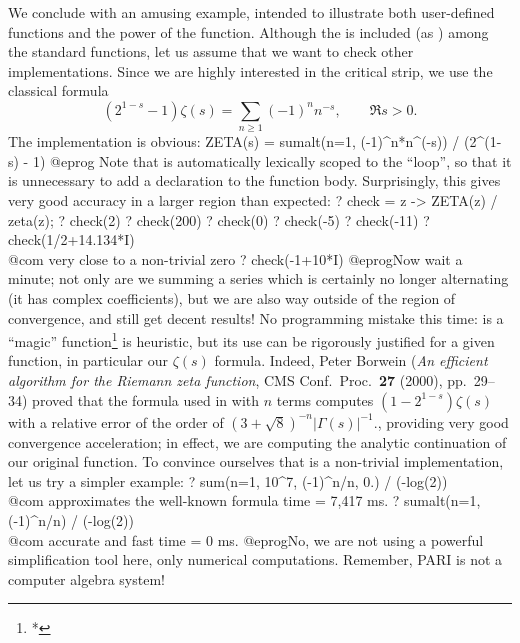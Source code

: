  We conclude with an amusing example, intended to
illustrate both user-defined functions and the power of the 
function. Although the  is included (as
) among the standard functions, let us assume that we want to check
other implementations. Since we are highly interested in the critical strip,
we use the classical formula
$$ (2^{1-s} - 1)\zeta(s) = \sum_{n\geq 1} (-1)^n n^{-s},
  \qquad\Re s > 0.$$
The implementation is obvious:
\bprog
ZETA(s) = sumalt(n=1, (-1)^n*n^(-s)) / (2^(1-s) - 1)
@eprog
\noindent
Note that  is automatically lexically scoped to the 
``loop'', so that it is unnecessary to add a  declaration to the
function body. Surprisingly, this gives very good accuracy in a larger region
than expected:
\bprog
? check = z -> ZETA(z) / zeta(z);
? check(2)
? check(200)
? check(0)
? check(-5)
? check(-11)
? check(1/2+14.134*I)  \\@com very close to a non-trivial zero
? check(-1+10*I)
@eprog\noindent Now wait a minute; not only are we summing a series which is
certainly no longer alternating (it has complex coefficients), but we are
also way outside of the region of convergence, and still get decent results! No
programming mistake this time:  is a
``magic'' function\footnote{*}{ is heuristic, but its use can be
rigorously justified for a given function, in particular our $\zeta(s)$
formula. Indeed, Peter Borwein (\emph{An efficient algorithm for the Riemann
zeta function}, CMS Conf.~Proc.~{\bf 27} (2000), pp.~29--34) proved that the
formula used in  with $n$ terms computes $(1-2^{1-s})\zeta(s)$
with a relative error of the order of $(3+\sqrt{8})^{-n}|\Gamma(s)|^{-1}$.},
providing very good convergence acceleration; in effect, we are computing
the analytic continuation of our original function. To convince ourselves
that  is a non-trivial implementation, let us try a simpler
example:
\bprog
? sum(n=1, 10^7, (-1)^n/n, 0.) / (-log(2)) \\@com approximates the well-known formula
time = 7,417 ms.
? sumalt(n=1, (-1)^n/n) / (-log(2))        \\@com accurate and fast
time = 0 ms.
@eprog\noindent No, we are not using a powerful simplification tool here,
only numerical computations. Remember, PARI is not a computer algebra system!


